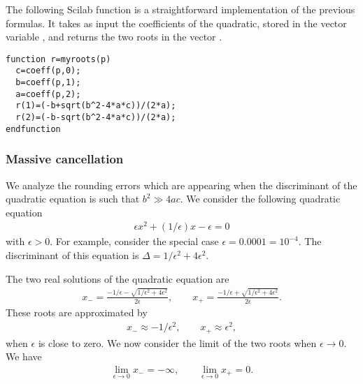 The following Scilab function  is a straightforward implementation
of the previous formulas. It takes as input the coefficients of the quadratic, stored in the 
vector variable , and returns the two roots in the vector .
\lstset{language=scilabscript}
\begin{lstlisting}
function r=myroots(p)
  c=coeff(p,0);
  b=coeff(p,1);
  a=coeff(p,2);
  r(1)=(-b+sqrt(b^2-4*a*c))/(2*a);
  r(2)=(-b-sqrt(b^2-4*a*c))/(2*a);
endfunction
\end{lstlisting}

\subsubsection{Massive cancellation}
\label{section-exp-quadraticrounding}

We analyze the rounding errors which are 
appearing when the discriminant of the quadratic equation 
is such that $b^2\gg 4ac$.
We consider the following quadratic equation 
\begin{eqnarray}
\label{sinn-eq-roundingerror}
\epsilon x^2 + (1/\epsilon)x - \epsilon = 0
\end{eqnarray}
with $\epsilon>0$. For example, consider the special case $\epsilon=0.0001=10^{-4}$. 
The discriminant of this equation is $\Delta = 1/\epsilon^2+4\epsilon^2$.

The two real solutions of the quadratic equation are
\begin{eqnarray}
\label{sinn-eq-roundingerror-roots}
x_- = \frac{-1/\epsilon- \sqrt{1/\epsilon^2+4\epsilon^2}}{2\epsilon}, \qquad
x_+ = \frac{-1/\epsilon+ \sqrt{1/\epsilon^2+4\epsilon^2}}{2\epsilon}.
\end{eqnarray}
These roots are approximated by 
\begin{eqnarray}
\label{sinn-eq-roundingerror-roots-approx}
x_- \approx  -1/\epsilon^2, \qquad
x_+ \approx  \epsilon^2,
\end{eqnarray}
when $\epsilon$ is close to zero.
We now consider the limit of the two roots when $\epsilon \rightarrow 0$. We have 
\begin{eqnarray}
\lim_{\epsilon\rightarrow 0} x_- = -\infty, \qquad
\lim_{\epsilon\rightarrow 0} x_+ = 0.
\end{eqnarray}


